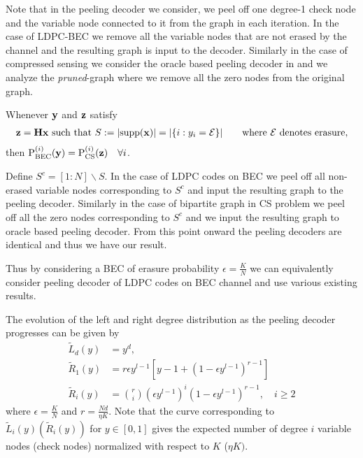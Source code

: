 \documentclass[conference,onecolumn]{IEEEtran}
\begin{document}
Note that in the peeling decoder we consider, we peel off one degree-1 check node and the variable node connected to it from the graph in each iteration. In the case of LDPC-BEC we remove all the variable nodes that are not erased by the channel and the resulting graph is input to the decoder. Similarly in the case of compressed sensing we consider the  oracle based peeling decoder in \cite{li2015subdraft} and we analyze the \textit{pruned}-graph where we remove all the zero nodes from the original graph.

\begin{lemma}
\label{Lemma:Equiv_LDPC_BEC}
Whenever $\mathbf{y}$ and $\mathbf{z}$ satisfy
\begin{align*}
\mathbf{z=Hx} \text{ such that  } S:=|\text{supp}(\mathbf{x})|=|\{i:y_i=\mathcal{E}\}| \qquad \text{where } \mathcal{E} \text{ denotes erasure},
\end{align*}
then $\text{P}_{\text{BEC}}^{(i)}(\mathbf{y})=\text{P}_{\text{CS}}^{(i)}(\mathbf{z}) \quad \forall i$.
\end{lemma}
\begin{IEEEproof}
Define $S^c=[1:N]\backslash S$. In the case of LDPC codes on BEC we peel off all non-erased variable nodes corresponding to $S^c$  and input the resulting graph to the peeling decoder. Similarly in the case of bipartite graph in CS problem we peel off all the zero nodes corresponding to $S^c$ and we input the resulting graph to oracle based peeling decoder. From this point onward the peeling decoders are identical and thus we have our result.
\end{IEEEproof}
\vspace{1ex}
Thus by considering a BEC of erasure probability $\epsilon=\frac{K}{N}$ we can equivalently consider peeling decoder of LDPC codes on BEC channel and use various existing results.
\begin{lemma}
\label{lem:RightDegEvolution}
The evolution of the left and right degree distribution as the peeling decoder progresses can be given by
\begin{align*}
\tilde{L}_d(y)&= y^d,\\
\tilde{R}_{1}(y)&=r\epsilon y^{l-1}[y-1+ (1-\epsilon y^{l-1})^{r-1}]\\
\tilde{R}_{i}(y)&=\binom{r}{i}(\epsilon y^{l-1})^i (1-\epsilon y^{l-1})^{r-1}, \quad i\geq 2
\end{align*}
where $\epsilon=\frac{K}{N}$ and $r=\frac{Nd}{\eta K}$. Note that the curve corresponding to $\tilde{L}_i(y)(\tilde{R}_{i}(y))$ for $y\in[0,1]$ gives the expected number of degree $i$ variable nodes (check nodes) normalized with respect to $K$ ($\eta K)$.
\end{lemma}
\end{document}
